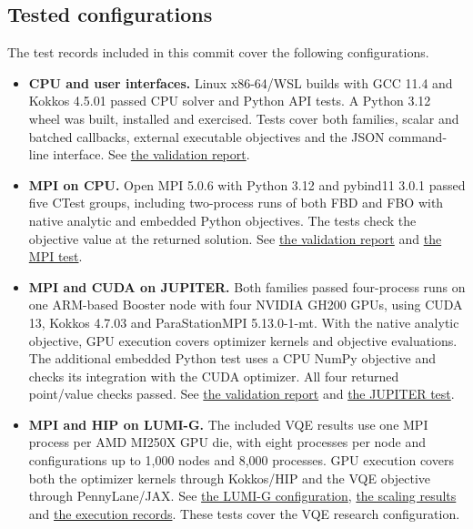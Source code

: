 \subsection{Tested configurations}
\label{sec:Zellij:validation}

The test records included in this commit cover the following configurations.

\begin{itemize}
\item \textbf{CPU and user interfaces.} Linux x86-64/WSL builds with GCC
11.4 and Kokkos 4.5.01 passed CPU solver and Python API tests. A Python 3.12
wheel was built, installed and exercised. Tests cover both families,
scalar and batched callbacks, external executable objectives and the JSON
command-line interface. See \href{https://github.com/MehdielKhadiri/Exa-Zellij/blob/eddc639b034b0ca26f145c407f398e908e5b4498/docs/validation.md}{the validation report}.

\item \textbf{MPI on CPU.} Open MPI 5.0.6 with Python 3.12 and pybind11
3.0.1 passed five CTest groups, including two-process runs of both FBD and
FBO with native analytic and embedded Python objectives. The tests check
the objective value at the returned solution. See \href{https://github.com/MehdielKhadiri/Exa-Zellij/blob/eddc639b034b0ca26f145c407f398e908e5b4498/docs/validation.md}{the validation report} and \href{https://github.com/MehdielKhadiri/Exa-Zellij/blob/eddc639b034b0ca26f145c407f398e908e5b4498/tests/test_mpi.py}{the MPI test}.

\item \textbf{MPI and CUDA on JUPITER.} Both families passed four-process
runs on one ARM-based Booster node with four NVIDIA GH200 GPUs, using
CUDA 13, Kokkos 4.7.03 and ParaStationMPI 5.13.0-1-mt. With the native
analytic objective, GPU execution covers optimizer kernels and objective
evaluations. The additional embedded Python test uses a CPU NumPy
objective and checks its integration with the CUDA optimizer. All four
returned point/value checks passed. See \href{https://github.com/MehdielKhadiri/Exa-Zellij/blob/eddc639b034b0ca26f145c407f398e908e5b4498/docs/validation.md}{the validation report} and \href{https://github.com/MehdielKhadiri/Exa-Zellij/blob/eddc639b034b0ca26f145c407f398e908e5b4498/scripts/jupiter/smoke.sbatch}{the JUPITER test}.

\item \textbf{MPI and HIP on LUMI-G.} The included VQE results use one MPI process
per AMD MI250X GPU die, with eight processes per node and configurations
up to 1,000 nodes and 8,000 processes. GPU execution covers both the
optimizer kernels through Kokkos/HIP and the VQE objective through
PennyLane/JAX. See \href{https://github.com/MehdielKhadiri/Exa-Zellij/blob/eddc639b034b0ca26f145c407f398e908e5b4498/docs/lumi-g.md}{the LUMI-G configuration}, \href{https://github.com/MehdielKhadiri/Exa-Zellij/blob/eddc639b034b0ca26f145c407f398e908e5b4498/reproducibility/lumi_g/results/strong_scaling.csv}{the scaling results} and \href{https://github.com/MehdielKhadiri/Exa-Zellij/blob/eddc639b034b0ca26f145c407f398e908e5b4498/reproducibility/lumi_g/raw_evidence/log_excerpts.txt}{the execution records}.
These tests cover the VQE research configuration.


\end{itemize}
